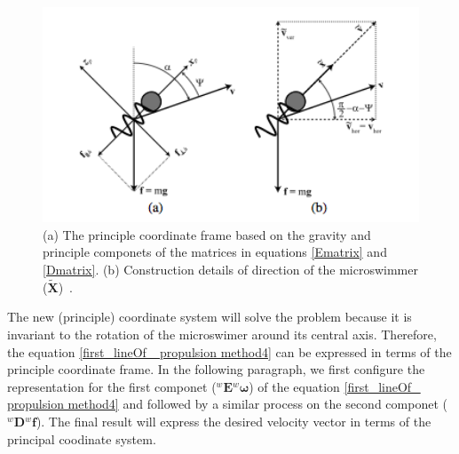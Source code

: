 \documentclass[12pt,a4paper,titlepage]{report}
\begin{document}
\begin{figure}
  \centering
    \includegraphics[width=1.0\textwidth]{horiz_verti_velocity}
  \caption[Construction details of 
direction of the microswimmer]{(a) The principle coordinate frame based on the gravity and principle componets
of the matrices in equations \ref{Ematrix} and \ref{Dmatrix}. (b) Construction details of 
direction of the microswimmer ($\bm{\tilde{X}}$)~\citep{mahoney2011velocity}.}
  \label{horiz_verti_velocity}
\end{figure}

The new (principle) coordinate system will solve the problem because it is invariant to the rotation
 of the microswimer around its central axis. Therefore, the equation \ref{first_lineOf_ propulsion method4} can
be expressed in terms of the principle coordinate frame. In the following paragraph,
we first configure the representation for the first componet (${^{w}\bm{E}} {^{w}\bm{\omega}}$) of the 
equation \ref{first_lineOf_ propulsion method4} 
 and followed by a similar process on the second componet (${^{w}\bm{D}} {^{w}\bm{f}}$). The final result will express the 
desired velocity vector in terms of the principal coodinate system. 
\end{document}
